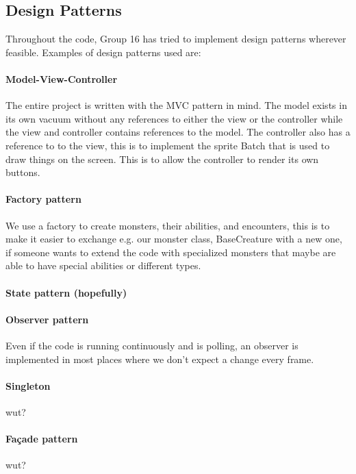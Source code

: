 \subsection{Design Patterns}
Throughout the code, Group 16 has tried to implement design patterns wherever feasible. Examples of design patterns used are:
\paragraph{Model-View-Controller\\}
The entire project is written with the MVC pattern in mind. The model exists in its own vacuum without any references to either the view or the controller while the view and controller contains references to the model. The controller also has a reference to to the view, this is to implement the sprite Batch that is used to draw things on the screen. This is to allow the controller to render its own buttons.
\paragraph{Factory pattern\\}
We use a factory to create monsters, their abilities, and encounters, this is to make it easier to exchange e.g. our monster class, BaseCreature with a new one, if someone wants to extend the code with specialized monsters that maybe are able to have special abilities or different types.
\paragraph{State pattern (hopefully)\\}
\paragraph{Observer pattern\\}
Even if the code is running continuously and is polling, an observer is implemented in most places where we don't expect a change every frame.
\paragraph{Singleton\\}
wut?%
\paragraph{Façade pattern\\}
wut?%
